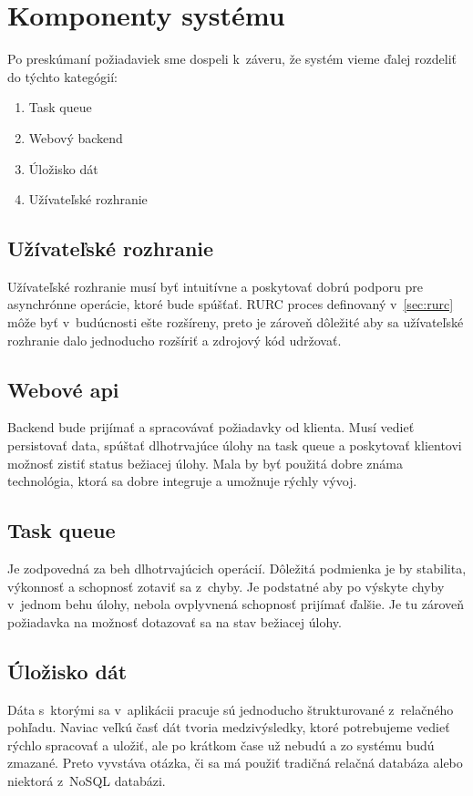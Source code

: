 \section{Komponenty systému}
Po preskúmaní požiadaviek sme dospeli k~záveru, že systém vieme ďalej rozdeliť do týchto kategógií:

\begin{enumerate}
  \item Task queue
  \item Webový backend
  \item Úložisko dát
  \item Užívateľské rozhranie
\end{enumerate}

\subsection{Užívateľské rozhranie}
Užívateľské rozhranie musí byť intuitívne a poskytovať dobrú podporu pre asynchrónne operácie, ktoré bude spúšťať. RURC proces definovaný v~\ref{sec:rurc} môže byť v~budúcnosti ešte rozšíreny, preto je zároveň dôležité aby sa užívateľské rozhranie dalo jednoducho rozšíriť a zdrojový kód udržovať.

\subsection{Webové api}
Backend bude prijímať a spracovávať požiadavky od klienta. Musí vedieť persistovať data, spúštať dlhotrvajúce úlohy na task queue a poskytovať klientovi možnosť zistiť status bežiacej úlohy. Mala by byť použitá dobre známa technológia, ktorá sa dobre integruje a umožnuje rýchly vývoj.

\subsection{Task queue}
Je zodpovedná za beh dlhotrvajúcich operácií. Dôležitá podmienka je by stabilita, výkonnosť a schopnosť zotaviť sa z~chyby. Je podstatné aby po výskyte chyby v~jednom behu úlohy, nebola ovplyvnená schopnosť prijímať ďalšie. Je tu zároveň požiadavka na možnosť dotazovať sa na stav bežiacej úlohy.

\subsection{Úložisko dát}
Dáta s~ktorými sa v~aplikácii pracuje sú jednoducho štrukturované z~relačného pohľadu. Naviac veľkú časť dát tvoria medzivýsledky, ktoré potrebujeme vedieť rýchlo spracovať a uložiť, ale po krátkom čase už nebudú a zo systému budú zmazané. Preto vyvstáva otázka, či sa má použiť tradičná relačná databáza alebo niektorá z~NoSQL databázi. 

